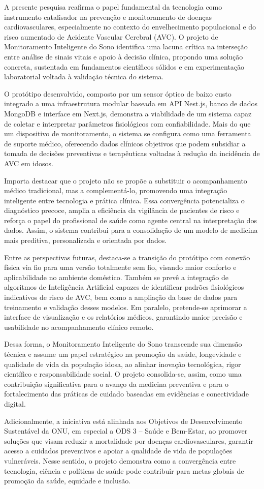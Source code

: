 A presente pesquisa reafirma o papel fundamental da tecnologia como instrumento catalisador na prevenção e monitoramento de doenças cardiovasculares, especialmente no contexto do envelhecimento populacional e do risco aumentado de Acidente Vascular Cerebral (AVC). O projeto de Monitoramento Inteligente do Sono identifica uma lacuna crítica na interseção entre análise de sinais vitais e apoio à decisão clínica, propondo uma solução concreta, sustentada em fundamentos científicos sólidos e em experimentação laboratorial voltada à validação técnica do sistema.

O protótipo desenvolvido, composto por um sensor óptico de baixo custo integrado a uma infraestrutura modular baseada em API Nest.js, banco de dados MongoDB e interface em Next.js, demonstra a viabilidade de um sistema capaz de coletar e interpretar parâmetros fisiológicos com confiabilidade. Mais do que um dispositivo de monitoramento, o sistema se configura como uma ferramenta de suporte médico, oferecendo dados clínicos objetivos que podem subsidiar a tomada de decisões preventivas e terapêuticas voltadas à redução da incidência de AVC em idosos.

Importa destacar que o projeto não se propõe a substituir o acompanhamento médico tradicional, mas a complementá-lo, promovendo uma integração inteligente entre tecnologia e prática clínica. Essa convergência potencializa o diagnóstico precoce, amplia a eficiência da vigilância de pacientes de risco e reforça o papel do profissional de saúde como agente central na interpretação dos dados. Assim, o sistema contribui para a consolidação de um modelo de medicina mais preditiva, personalizada e orientada por dados.

Entre as perspectivas futuras, destaca-se a transição do protótipo com conexão física via fio para uma versão totalmente sem fio, visando maior conforto e aplicabilidade no ambiente doméstico. Também se prevê a integração de algoritmos de Inteligência Artificial capazes de identificar padrões fisiológicos indicativos de risco de AVC, bem como a ampliação da base de dados para treinamento e validação desses modelos. Em paralelo, pretende-se aprimorar a interface de visualização e os relatórios médicos, garantindo maior precisão e usabilidade no acompanhamento clínico remoto.

Dessa forma, o Monitoramento Inteligente do Sono transcende sua dimensão técnica e assume um papel estratégico na promoção da saúde, longevidade e qualidade de vida da população idosa, ao alinhar inovação tecnológica, rigor científico e responsabilidade social. O projeto consolida-se, assim, como uma contribuição significativa para o avanço da medicina preventiva e para o fortalecimento das práticas de cuidado baseadas em evidências e conectividade digital.

Adicionalmente, a iniciativa está alinhada aos Objetivos de Desenvolvimento Sustentável da ONU, em especial a ODS 3 – Saúde e Bem-Estar, ao promover soluções que visam reduzir a mortalidade por doenças cardiovasculares, garantir acesso a cuidados preventivos e apoiar a qualidade de vida de populações vulneráveis. Nesse sentido, o projeto demonstra como a convergência entre tecnologia, ciência e políticas de saúde pode contribuir para metas globais de promoção da saúde, equidade e inclusão.
